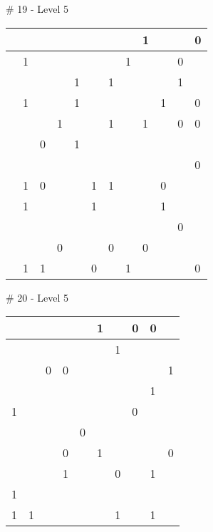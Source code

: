 \medskip

\# 19 - Level 5 \newline
\begin{tabular}{|m{\collen}|m{\collen}|m{\collen}|m{\collen}|m{\collen}|m{\collen}|m{\collen}|m{\collen}|m{\collen}|m{\collen}|m{\collen}|m{\collen}|}
\hline
    &   &   &   &   &   &   &   & 1 &   &   & 0 \\
\hline
    & 1 &   &   &   &   &   & 1 &   &   & 0 &   \\
\hline
    &   &   &   & 1 &   & 1 &   &   &   & 1 &   \\
\hline
    & 1 &   &   & 1 &   &   &   &   & 1 &   & 0 \\
\hline
    &   &   & 1 &   &   & 1 &   & 1 &   & 0 & 0 \\
\hline
    &   & 0 &   & 1 &   &   &   &   &   &   &   \\
\hline
    &   &   &   &   &   &   &   &   &   &   & 0 \\
\hline
    & 1 & 0 &   &   & 1 & 1 &   &   & 0 &   &   \\
\hline
    & 1 &   &   &   & 1 &   &   &   & 1 &   &   \\
\hline
    &   &   &   &   &   &   &   &   &   & 0 &   \\
\hline
    &   &   & 0 &   &   & 0 &   & 0 &   &   &   \\
\hline
    & 1 & 1 &   &   & 0 &   & 1 &   &   &   & 0 \\
\hline
\end{tabular}


\medskip

\# 20 - Level 5 \newline
\begin{tabular}{|m{\collen}|m{\collen}|m{\collen}|m{\collen}|m{\collen}|m{\collen}|m{\collen}|m{\collen}|m{\collen}|m{\collen}|}
\hline
    &   &   &   &   & 1 &   & 0 & 0 &   \\
\hline
    &   &   &   &   &   & 1 &   &   &   \\
\hline
    &   & 0 & 0 &   &   &   &   &   & 1 \\
\hline
    &   &   &   &   &   &   &   & 1 &   \\
\hline
  1 &   &   &   &   &   &   & 0 &   &   \\
\hline
    &   &   &   & 0 &   &   &   &   &   \\
\hline
    &   &   & 0 &   & 1 &   &   &   & 0 \\
\hline
    &   &   & 1 &   &   & 0 &   & 1 &   \\
\hline
  1 &   &   &   &   &   &   &   &   &   \\
\hline
  1 & 1 &   &   &   &   & 1 &   & 1 &   \\
\hline
\end{tabular}


